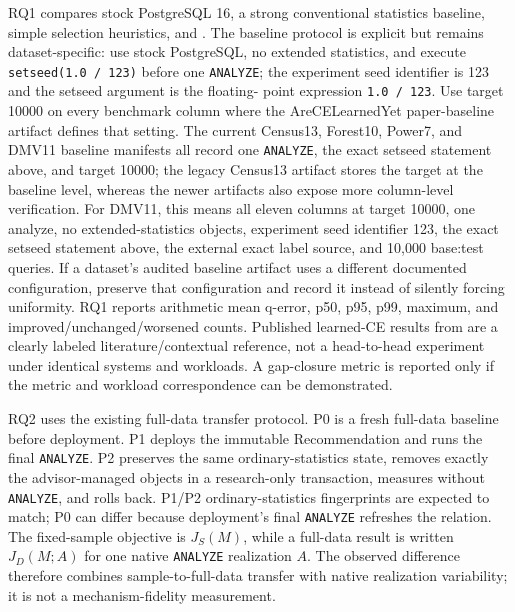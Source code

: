 RQ1 compares stock PostgreSQL 16, a strong conventional statistics baseline,
simple selection heuristics, and \advisor. The baseline protocol is explicit
but remains dataset-specific: use stock PostgreSQL, no extended statistics,
and execute \texttt{setseed(1.0 / 123)} before one \texttt{ANALYZE};
the experiment seed identifier is 123 and the setseed argument is the floating-
point expression \texttt{1.0 / 123}. Use target 10000 on every benchmark
column where the AreCELearnedYet paper-baseline artifact defines that setting.
The current Census13, Forest10, Power7, and DMV11 baseline manifests all
record one \texttt{ANALYZE}, the exact setseed statement above, and target
10000; the
legacy Census13 artifact stores the target at the baseline level, whereas the
newer artifacts also expose more column-level verification.
For DMV11, this means all eleven columns at target 10000, one analyze, no
extended-statistics objects, experiment seed identifier 123, the exact
setseed statement above, the external exact label source, and 10,000 base:test
queries. If a dataset's audited baseline artifact uses a
different documented configuration, preserve that configuration and record it
instead of silently forcing uniformity. RQ1 reports arithmetic mean q-error,
p50, p95, p99, maximum, and improved/unchanged/worsened counts. Published
learned-CE results from \cite{Wang2021AreWeReady} are a clearly labeled
literature/contextual reference, not a head-to-head experiment under identical
systems and workloads. A gap-closure metric is reported only if the metric and
workload correspondence can be demonstrated.

RQ2 uses the existing full-data transfer protocol. P0 is a fresh full-data
baseline before deployment. P1 deploys the immutable Recommendation and runs
the final \texttt{ANALYZE}. P2 preserves the same ordinary-statistics state,
removes exactly the advisor-managed objects in a research-only transaction,
measures without \texttt{ANALYZE}, and rolls back. P1/P2 ordinary-statistics
fingerprints are expected to match; P0 can differ because deployment's final
\texttt{ANALYZE} refreshes the relation. The fixed-sample objective is
$J_S(M)$, while a full-data result is written $J_D(M;A)$ for one native
\texttt{ANALYZE} realization $A$. The observed difference therefore combines
sample-to-full-data transfer with native realization variability; it is not a
mechanism-fidelity measurement.

